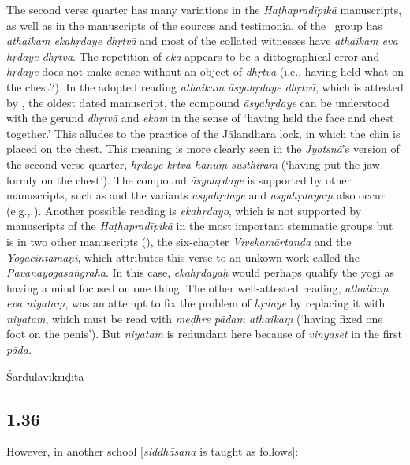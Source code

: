 \begin{ekdosis}
\begin{testimonia}[hp01_035]
\end{testimonia}

\begin{philcomm}[hp01_035]
The second verse quarter has many variations in the \emph{Haṭhapradīpikā} manuscripts, as well as in the manuscripts of the sources and testimonia.  of the \textalpha\ group has \emph{athaikam ekahṛdaye dhṛtvā} and most of the collated witnesses have \emph{athaikam eva hṛdaye dhṛtvā}. The repetition of \emph{eka} appears to be a dittographical error and \emph{hṛdaye} does not make sense without an object of \emph{dhṛtvā} (i.e., having held what on the chest?). In the adopted reading \emph{athaikam āsyahṛdaye dhṛtvā}, which is attested by \etaOne, the oldest dated manuscript, the compound \emph{āsyahṛdaye} can be understood with the gerund \emph{dhṛtvā} and \emph{ekam} in the sense of `having held the face and chest together.' This alludes to the practice of the Jālandhara lock, in which the chin is placed on the chest. This meaning is more clearly seen in the \emph{Jyotsnā}'s version of the second verse quarter, \emph{hṛdaye kṛtvā hanuṃ susthiram} (`having put the jaw formly on the chest'). The compound \emph{āsyahṛdaye} is supported by other manuscripts, such as  and the variants \emph{asyahṛdaye} and \emph{asyahṛdayaṃ} also occur (e.g., ). Another possible reading is \emph{ekahṛdayo}, which is not supported by manuscripts of the \emph{Haṭhapradīpikā} in the most important stemmatic groups but is in two other manuscripts (), the six-chapter \emph{Vivekamārtaṇḍa} and the \emph{Yogacintāmaṇi}, which attributes this verse to an unkown work called the \emph{Pavanayogasaṅgraha}. 
In this case, \emph{ekahṛdayaḥ} would perhaps qualify the yogi as having a mind focused on one thing. The other well-attested reading, \emph{athaikaṃ eva niyataṃ}, was an attempt to fix the problem of \emph{hṛdaye} by replacing it with \emph{niyatam}, which must be read with \emph{meḍhre pādam athaikaṃ} (`having fixed one foot on the penis'). But \emph{niyatam} is redundant here because of \emph{vinyaset} in the first \emph{pāda}.     

\end{philcomm}

\begin{metre}[hp01_035]
Śārdūlavikrīḍita 
\end{metre}

\subsection*{1.36}
\begin{translation}[hp01_036]
However, in another school [\emph{siddhāsana} is taught as follows]:\\


\end{translation}
\end{ekdosis}

